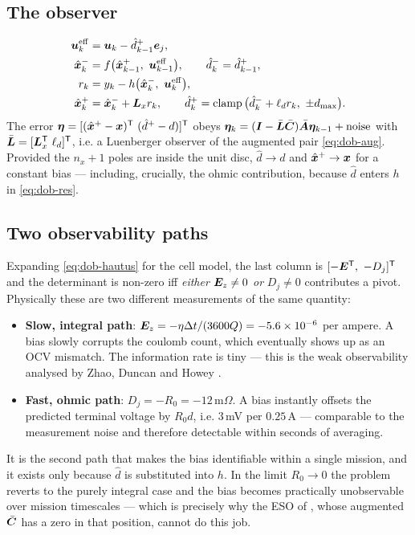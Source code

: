 \subsection{The observer}
\begin{align}
\bm{u}^{\mathrm{eff}}_k &= \bm{u}_k - \hat{d}^+_{k-1}\bm{e}_j , \label{eq:dob-ueff}\\
\hat{\bm{x}}^{-}_k &= f\big(\hat{\bm{x}}^{+}_{k-1},\ \bm{u}^{\mathrm{eff}}_{k-1}\big) , \qquad \hat{d}^-_k = \hat{d}^+_{k-1} , \label{eq:dob-pred}\\
r_k &= y_k - h\big(\hat{\bm{x}}^{-}_k,\ \bm{u}^{\mathrm{eff}}_k\big) , \label{eq:dob-res}\\
\hat{\bm{x}}^{+}_k &= \hat{\bm{x}}^{-}_k + \bm{L}_x r_k , \qquad
\hat{d}^+_k = \operatorname{clamp}\big(\hat{d}^-_k + \ell_d r_k,\ \pm d_{\max}\big) . \label{eq:dob-upd}
\end{align}
The error $\bm{\eta} = [(\hat{\bm{x}}^{+}-\bm{x})^{\mathsf{T}}\ (\hat{d}^+-d)]^{\mathsf{T}}$ obeys
$\bm{\eta}_k = (\bm{I}-\bar{\bm{L}}\bar{\bm{C}})\bar{\bm{A}}\bm{\eta}_{k-1} + \text{noise}$ with
$\bar{\mL} = [\mL_x^\T\ \ell_d]^\T$, i.e. a Luenberger observer of the augmented pair
\eqref{eq:dob-aug}.  Provided the $n_x+1$ poles are inside the unit disc, $\hat{d}\to d$ and
$\hat{\bm{x}}^{+}\to\bm{x}$ for a constant bias --- including, crucially, the ohmic contribution, because
$\hat{d}$ enters $h$ in \eqref{eq:dob-res}.

\subsection{Two observability paths}
\label{sec:dob-obs}
Expanding \eqref{eq:dob-hautus} for the cell model, the last column is
$[-\bm{E}^\T,\ -D_j]^\T$ and the determinant is non-zero iff \emph{either} $\bm{E}_{z}\neq0$
\emph{or} $D_j\neq0$ contributes a pivot.  Physically these are two different measurements of the
same quantity:
\begin{itemize}[nosep]
\item \textbf{Slow, integral path}: $\bm{E}_{z} = -\eta\Delta t/(3600Q) = -5.6\times10^{-6}$ per
ampere.  A bias slowly corrupts the coulomb count, which eventually shows up as an OCV mismatch.
The information rate is tiny --- this is the weak observability analysed by Zhao, Duncan and Howey
\cite{zhao2017observability}.
\item \textbf{Fast, ohmic path}: $D_j = -R_0 = -12$\,m$\Omega$.  A bias instantly offsets the
predicted terminal voltage by $R_0 d$, i.e. $3$\,mV per $0.25$\,A --- comparable to the
measurement noise and therefore detectable within seconds of averaging.
\end{itemize}
It is the second path that makes the bias identifiable within a single mission, and it exists
only because $\hat{d}$ is substituted into $h$.  In the limit $R_0\to0$ the problem reverts to the
purely integral case and the bias becomes practically unobservable over mission timescales ---
which is precisely why the ESO of , whose augmented $\bar{\bm{C}}$ has a zero in that
position, cannot do this job.

